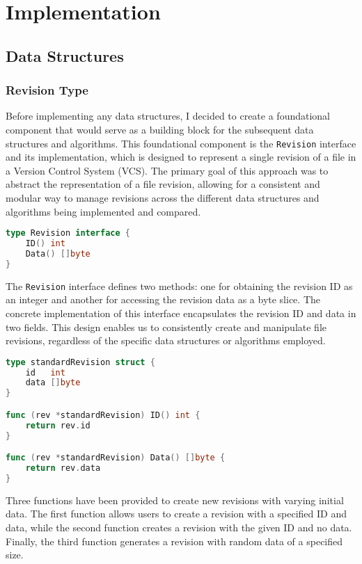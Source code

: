 \chapter{Implementation} %
\label{chap:implementation}
\section{Data Structures}
\subsection{Revision Type}
Before implementing any data structures, I decided to create a foundational component that would serve as a building block for the subsequent data structures and algorithms. This foundational component is the \lstinline{Revision} interface and its implementation, which is designed to represent a single revision of a file in a Version Control System (VCS). The primary goal of this approach was to abstract the representation of a file revision, allowing for a consistent and modular way to manage revisions across the different data structures and algorithms being implemented and compared.

\begin{lstlisting}[language=Go]
type Revision interface {
	ID() int
	Data() []byte
}
\end{lstlisting}
\medskip

The \lstinline{Revision} interface defines two methods: one for obtaining the revision ID as an integer and another for accessing the revision data as a byte slice. The concrete implementation of this interface encapsulates the revision ID and data in two fields. This design enables us to consistently create and manipulate file revisions, regardless of the specific data structures or algorithms employed.

\begin{lstlisting}[language=Go]
type standardRevision struct {
	id   int
	data []byte
}

func (rev *standardRevision) ID() int {
	return rev.id
}

func (rev *standardRevision) Data() []byte {
	return rev.data
}
\end{lstlisting}
\medskip

Three functions have been provided to create new revisions with varying initial data. The first function allows users to create a revision with a specified ID and data, while the second function creates a revision with the given ID and no data. Finally, the third function generates a revision with random data of a specified size.

